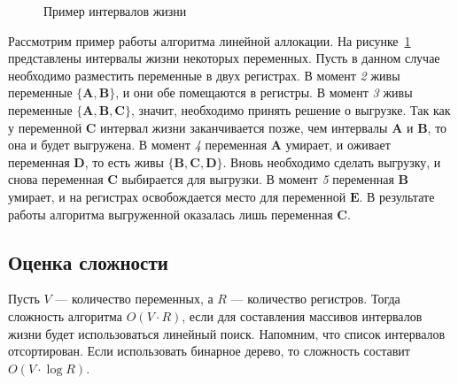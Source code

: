 \begin{example}
\begin{figure}
\begin{tikzpicture}
        \end{tikzpicture}
        \caption{Пример интервалов жизни}
        \label{fig:live_interval_example}
    \end{figure}

    Рассмотрим пример работы алгоритма линейной аллокации.
    На рисунке~\ref{fig:live_interval_example} представлены интервалы жизни
    некоторых переменных.
    Пусть в данном случае необходимо разместить переменные в двух регистрах.
    В момент \textit{2} живы переменные $\{\textbf{A}, \textbf{B}\}$, и они обе помещаются в регистры.
    В момент \textit{3} живы переменные $\{\textbf{A}, \textbf{B}, \textbf{C}\}$, значит, необходимо принять решение о выгрузке.
    Так как у переменной $\textbf{C}$ интервал жизни заканчивается позже, чем интервалы $\textbf{A}$ и $\textbf{B}$, то она и будет
    выгружена.
    В момент \textit{4} переменная $\textbf{A}$ умирает, и оживает переменная $\textbf{D}$, то есть живы $\{\textbf{B}, \textbf{C}, \textbf{D}\}$.
    Вновь необходимо сделать выгрузку, и снова переменная $\textbf{C}$ выбирается для выгрузки.
    В момент \textit{5} переменная $\textbf{B}$ умирает, и на регистрах освобождается место для переменной $\textbf{E}$.
    В результате работы алгоритма выгруженной оказалась лишь переменная $\textbf{C}$.
    
\end{example}

\subsection{Оценка сложности}

Пусть $V$ --- количество переменных, а $R$ --- количество регистров.
Тогда сложность алгоритма $\textit{O}(V \cdot R)$, если для составления массивов интервалов жизни будет использоваться
линейный поиск.
Напомним, что список интервалов отсортирован.
Если использовать бинарное дерево, то сложность составит $\textit{O}(V \cdot \log R)$.
